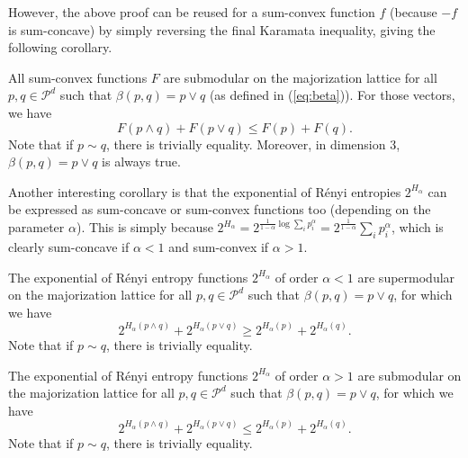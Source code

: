 However, the above proof can be reused for a sum-convex function $f$ (because $-f$ is sum-concave) by simply reversing the final Karamata inequality, giving the following corollary.

\begin{corollary} \label{cor:submodularity_sum-convex}
    All sum-convex functions $F$ are submodular on the majorization lattice for all $p, q \in \mathcal{P}^d$ such that $\beta(p, q) = p \vee q$ (as defined in (\ref{eq:beta})). For those vectors, we have
    \begin{equation} \label{eq:submodularity}
        F(p \wedge q) + F(p \vee q) \leq F(p) + F(q).
    \end{equation}
    Note that if $p \sim q$, there is trivially equality. Moreover, in dimension 3, $\beta(p, q) = p \vee q$ is always true.
\end{corollary}

Another interesting corollary is that the exponential of R\'enyi entropies $2^{H_\alpha}$ can be expressed as sum-concave or sum-convex functions too (depending on the parameter $\alpha$). This is simply because $2^{H_\alpha} = 2^{\frac{1}{1-\alpha}\log \sum_{i}p_i^\alpha} = 2^{\frac{1}{1-\alpha}} \sum_{i}p_i^\alpha$, which is clearly sum-concave if $\alpha < 1$ and sum-convex if $\alpha > 1$.

\begin{corollary} \label{cor:renyi_leq_1}
    The exponential of Rényi entropy functions $2^{H_\alpha}$ of order $\alpha < 1$ are supermodular on the majorization lattice for all $p, q \in \mathcal{P}^d$ such that $\beta(p, q) = p \vee q$, for which we have
    \begin{equation} \label{eq:supermodularity_renyi}
        2^{H_\alpha(p \wedge q)} + 2^{H_\alpha(p \vee q)} \geq 2^{H_\alpha(p)} + 2^{H_\alpha(q)}.
    \end{equation}
    Note that if $p \sim q$, there is trivially equality.
\end{corollary}

\begin{corollary} \label{cor:renyi_geq_1}
    The exponential of Rényi entropy functions $2^{H_\alpha}$  of order $\alpha > 1$ are submodular on the majorization lattice for all $p, q \in \mathcal{P}^d$ such that $\beta(p, q) = p \vee q$, for which we have
    \begin{equation} \label{eq:submodularity_renyi}
        2^{H_\alpha(p \wedge q)} + 2^{H_\alpha(p \vee q)} \leq 2^{H_\alpha(p)} + 2^{H_\alpha(q)}.
    \end{equation}
    Note that if $p \sim q$, there is trivially equality.
\end{corollary}


